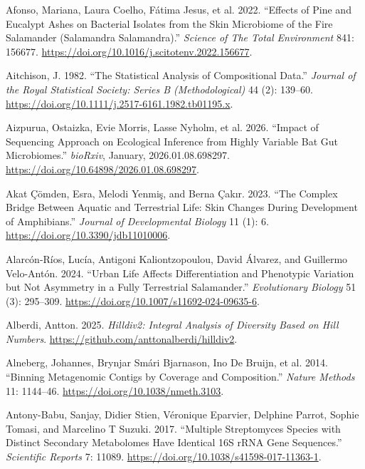 \documentclass[
  12pt,
]{article}
\newlength{\cslhangindent}
\newenvironment{CSLReferences}[2] %
 {\begin{list}{}{%
  \setlength{\itemindent}{0pt}
  \setlength{\leftmargin}{0pt}
  \setlength{\parsep}{0pt}
  \ifodd #1
   \setlength{\leftmargin}{\cslhangindent}
   \setlength{\itemindent}{-1\cslhangindent}
  \fi
  \setlength{\itemsep}{#2\baselineskip}}}
 {\end{list}}
\begin{document}
\protect{}\label{refs}
\begin{CSLReferences}{1}{1}
Afonso, Mariana, Laura Coelho, Fátima Jesus, et al. 2022. {``Effects of
{Pine} and {Eucalypt} Ashes on Bacterial Isolates from the Skin
Microbiome of the Fire Salamander ({Salamandra} Salamandra).''}
\emph{Science of The Total Environment} 841: 156677.
\url{https://doi.org/10.1016/j.scitotenv.2022.156677}.

Aitchison, J. 1982. {``The {Statistical} {Analysis} of {Compositional}
{Data}.''} \emph{Journal of the Royal Statistical Society: Series B
(Methodological)} 44 (2): 139--60.
\url{https://doi.org/10.1111/j.2517-6161.1982.tb01195.x}.

Aizpurua, Ostaizka, Evie Morris, Lasse Nyholm, et al. 2026. {``Impact of
Sequencing Approach on Ecological Inference from Highly Variable Bat Gut
Microbiomes.''} \emph{bioRxiv}, January, 2026.01.08.698297.
\url{https://doi.org/10.64898/2026.01.08.698297}.

Akat Çömden, Esra, Melodi Yenmiş, and Berna Çakır. 2023. {``The Complex
Bridge Between Aquatic and Terrestrial Life: {Skin} Changes During
Development of Amphibians.''} \emph{Journal of Developmental Biology} 11
(1): 6. \url{https://doi.org/10.3390/jdb11010006}.

Alarcón-Ríos, Lucía, Antigoni Kaliontzopoulou, David Álvarez, and
Guillermo Velo-Antón. 2024. {``Urban Life Affects Differentiation and
Phenotypic Variation but Not Asymmetry in a Fully Terrestrial
Salamander.''} \emph{Evolutionary Biology} 51 (3): 295--309.
\url{https://doi.org/10.1007/s11692-024-09635-6}.

Alberdi, Antton. 2025. \emph{Hilldiv2: {Integral} {Analysis} of
{Diversity} {Based} on {Hill} {Numbers}}.
\url{https://github.com/anttonalberdi/hilldiv2}.

Alneberg, Johannes, Brynjar Smári Bjarnason, Ino De Bruijn, et al. 2014.
{``Binning Metagenomic Contigs by Coverage and Composition.''}
\emph{Nature Methods} 11: 1144--46.
\url{https://doi.org/10.1038/nmeth.3103}.

Antony-Babu, Sanjay, Didier Stien, Véronique Eparvier, Delphine Parrot,
Sophie Tomasi, and Marcelino T Suzuki. 2017. {``Multiple {Streptomyces}
Species with Distinct Secondary Metabolomes Have Identical {16S} {rRNA}
Gene Sequences.''} \emph{Scientific Reports} 7: 11089.
\url{https://doi.org/10.1038/s41598-017-11363-1}.


\end{CSLReferences}
\end{document}
